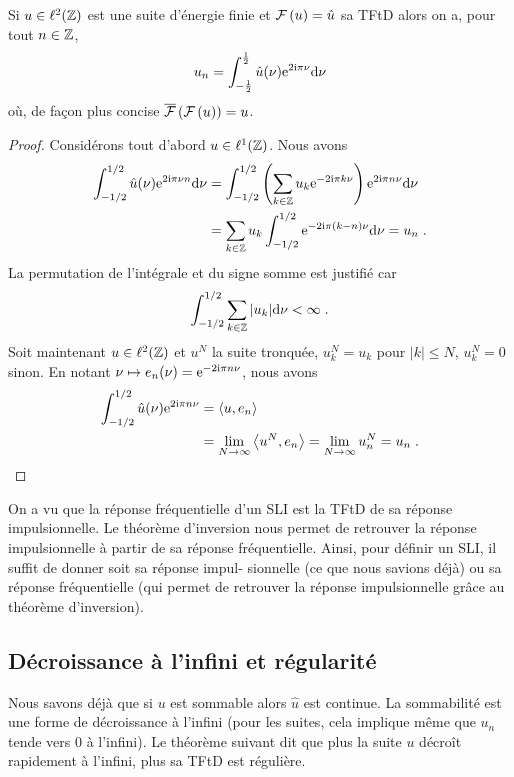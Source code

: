 \begin{theorem}
Si $u\in \ell^2(\mathbb{Z})$ est une suite d'\'{e}nergie finie et $\mathcal{F}\left( u \right)=\hat{u}$ sa TFtD alors on a, pour tout $n \in \mathbb{Z}$,
$$
u_{n}=\int_{-\frac{1}{2}}^{\frac{1}{2}}\hat{u}(\nu)\mathrm{e}^{2\mathrm{i} \pi \nu} \mathrm{d} \nu
$$
o\`u, de fa\c{c}on plus concise $\overline{\mathcal{F}}\left( \mathcal{F}\left( u \right) \right)=u$.
\end{theorem}
\begin{proof}
Consid\'erons tout d'abord $u \in \ell^1(\mathbb{Z})$. Nous avons
\begin{align*}
\int_{-1/2}^{1/2} \hat{u}(\nu) \mathrm{e}^{2 \mathrm{i} \pi \nu n} \mathrm{d} \nu &= \int_{-1/2}^{1/2} \left( \sum_{k \in \mathbb{Z}} u_k \mathrm{e}^{-2 \mathrm{i} \pi k \nu}\right) \mathrm{e}^{2 \mathrm{i} \pi n \nu} \mathrm{d} \nu \\
&= \sum_{k \in \mathbb{Z}} u_k \int_{-1/2}^{1/2} \mathrm{e}^{-2 \mathrm{i} \pi (k-n) \nu} \mathrm{d} \nu = u_n \;.
\end{align*}
La permutation de l'int\'egrale et du signe somme est justifi\'e car
\[
\int_{-1/2}^{1/2} \sum_{k \in \mathbb{Z}} |u_k| \mathrm{d} \nu < \infty \;.
\]
Soit maintenant $u \in \ell^2(\mathbb{Z})$ et $u^N$ la suite tronqu\'ee, $u^N_k = u_k$ pour $|k| \leq N$, $u_k^N=0$ sinon. En notant
$\nu \mapsto e_n(\nu)= \mathrm{e}^{-2 \mathrm{i} \pi n \nu }$, nous avons
\begin{align*}
\int_{-1/2}^{1/2} \hat{u}(\nu) \mathrm{e}^{2 \mathrm{i} \pi n \nu} &= \left\langle u, e_n \right\rangle \\
&= \lim_{N \to \infty} \left\langle u^N, e_n \right\rangle= \lim_{N \to \infty} u_n^N = u_n \;.
\end{align*}
\end{proof}
On a vu que la r\'{e}ponse fr\'{e}quentielle d'un SLI est la TFtD de sa r\'{e}ponse impulsionnelle. Le th\'{e}or\`{e}me d'inversion nous permet de retrouver la r\'{e}ponse impulsionnelle \`{a} partir de sa r\'{e}ponse fr\'{e}quentielle. Ainsi, pour d\'{e}finir un SLI, il suffit de donner soit sa r\'{e}ponse impul- sionnelle (ce que nous savions d\'{e}j\`{a}) ou sa r\'{e}ponse fr\'{e}quentielle (qui permet de retrouver la r\'{e}ponse impulsionnelle gr\^{a}ce au th\'{e}or\`{e}me d'inversion).

\subsection{D\'{e}croissance \`{a} l'infini et r\'{e}gularit\'{e}}
Nous savons d\'{e}j\`{a} que si $u$ est sommable alors $\hat{u}$ est continue. La sommabilit\'{e} est une forme de d\'{e}croissance \`{a} l'infini (pour les suites, cela implique m\^{e}me que $u_{n}$ tende vers $0$ \`{a} l'infini). Le th\'{e}or\`{e}me suivant dit que plus la suite $u$ décroît rapidement \`{a} l'infini, plus sa TFtD est r\'{e}guli\`{e}re.

